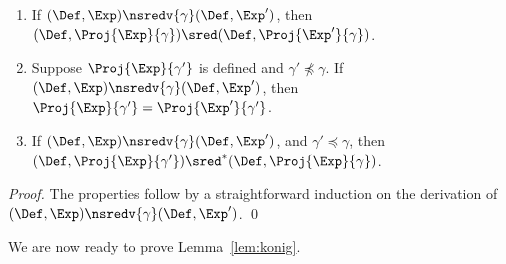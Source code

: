 \begin{lemma}
\label{lem:nsredv-vs-sred}
  \begin{enumerate}
\item  If \((\Def,\Exp)\nsredv{\gamma}(\Def,\Exp')\),
  then \((\Def, \Proj{\Exp}{\gamma})\sred (\Def,\Proj{\Exp'}{\gamma})\).
\item Suppose \(\Proj{\Exp}{\gamma'}\) is defined and \(\gamma'\not\preceq \gamma\).
  If \((\Def,\Exp)\nsredv{\gamma}(\Def,\Exp')\), then
  \(\Proj{\Exp}{\gamma'}=\Proj{\Exp'}{\gamma'}\).
\item
  If \((\Def,\Exp)\nsredv{\gamma}(\Def,\Exp')\), and \(\gamma'\preceq \gamma\),
  then \((\Def, \Proj{\Exp}{\gamma'} ) \sred^* (\Def, \Proj{\Exp}{\gamma})\).
\end{enumerate}  
\end{lemma}
\begin{proof}
  The properties follow by a straightforward induction on the derivation of
  \((\Def,\Exp)\nsredv{\gamma}(\Def,\Exp')\). \qed
\end{proof}

We are now ready to prove Lemma~\ref{lem:konig}.

